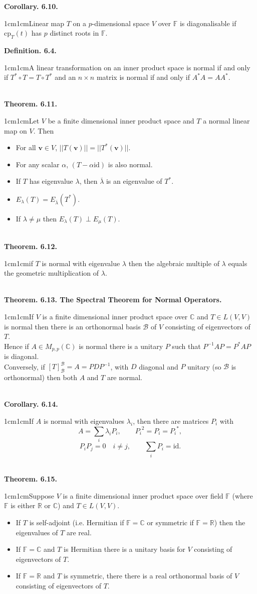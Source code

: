 \documentclass{article}
\newcommand{\vect}[1]{\mathbf{#1}}
\newcommand{\definition}[2]{\textbf{Definition. #1.}\begin{adjustwidth}{1cm}{1cm}#2\end{adjustwidth}}
\newcommand{\theorem}[2]{\textbf{Theorem. #1.}\begin{adjustwidth}{1cm}{1cm}#2\end{adjustwidth}}
\newcommand{\corollary}[2]{\textbf{Corollary. #1.}\begin{adjustwidth}{1cm}{1cm}#2\end{adjustwidth}}
\begin{document}
\corollary{6.10}{Linear map $T$ on a $p$-dimensional space $V$ over $\mathbb{F}$ is diagonalisable if $\text{cp}_T(t)$ has $p$ distinct roots in $\mathbb{F}$.}\newpage
\definition{6.4}{A linear transformation on an inner product space is normal if and only if $T^* \circ T = T \circ T^*$ and an $n \times n$ matrix is normal if and only if $A^*A = AA^*$.}~\\
\theorem{6.11}{Let $V$ be a finite dimensional inner product space and $T$ a normal linear map on $V$. Then
\begin{itemize}
  \item For all $\vect{v} \in V$, $||T(\vect{v})|| = ||T^*(\vect{v})||$.
  \item For any scalar $\alpha$, $(T-\alpha \text{id})$ is also normal.
  \item If $T$ has eigenvalue $\lambda$, then $\overline{\lambda}$ is an eigenvalue of $T^*$.
  \item $E_\lambda(T) = E_{\overline{\lambda}}(T^*)$.
  \item If $\lambda \neq \mu$ then $E_\lambda(T) \perp E_\mu(T)$.
\end{itemize}}~\\
\theorem{6.12}{if $T$ is normal with eigenvalue $\lambda$ then the algebraic multiple of $\lambda$ equals the geometric multiplication of $\lambda$.}~\\
\theorem{6.13. The Spectral Theorem for Normal Operators}{If $V$ is a finite dimensional inner product space over $\mathbb{C}$ and $T \in L(V,V)$ is normal then there is an orthonormal basis $\mathcal{B}$ of $V$ consisting of eigenvectors of $T$.\\Hence if $A \in M_{p,p}(\mathbb{C})$ is normal there is a unitary $P$ such that $P^{-1}AP = P^*AP$ is diagonal.\\Conversely, if $[T]_\mathcal{B}^\mathcal{B} = A = PDP^{-1}$, with $D$ diagonal and $P$ unitary (so $\mathcal{B}$ is orthonormal) then both $A$ and $T$ are normal.}~\\
\corollary{6.14}{If $A$ is normal with eigenvalues $\lambda_i$, then there are matrices $P_i$ with \[A = \sum_i \lambda_i P_i, \qquad {P_i}^2 = P_i = {P_i}^*,\] \[P_i P_j = 0 \quad i \neq j, \qquad \sum_i P_i = \text{id}.\]}~\\
\theorem{6.15}{Suppose $V$ is a finite dimensional inner product space over field $\mathbb{F}$ (where $\mathbb{F}$ is either $\mathbb{R}$ or $\mathbb{C}$) and $T \in L(V,V)$.
\begin{itemize}
  \item If $T$ is self-adjoint (i.e. Hermitian if $\mathbb{F} = \mathbb{C}$ or symmetric if $\mathbb{F} = \mathbb{R}$) then the eigenvalues of $T$ are real.
  \item If $\mathbb{F} = \mathbb{C}$ and $T$ is Hermitian there is a unitary basis for $V$ consisting of eigenvectors of $T$.
  \item If $\mathbb{F} = \mathbb{R}$ and $T$ is symmetric, there there is a real orthonormal basis of $V$ consisting of eigenvectors of $T$.
\end{itemize}}~\\
\end{document}
